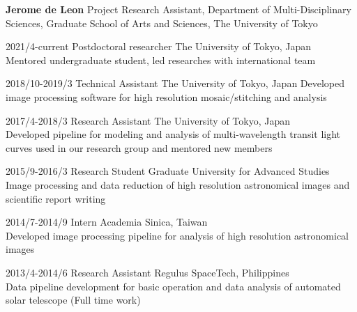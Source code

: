 \documentclass[12pt,letterpaper]{article}
\begin{document}
\thispagestyle{empty}\sloppy\sloppypar\raggedbottom

\textbf{\Large Jerome de Leon} 
Project Research Assistant, Department of Multi-Disciplinary Sciences, Graduate School of Arts and Sciences, The University of Tokyo\\[0.5ex]

\begin{list}{}{\cvlist}
\item 2021/4-current	Postdoctoral researcher	The University of Tokyo, Japan\\
Mentored undergraduate student, led researches with international team\\
\item 2018/10-2019/3	Technical Assistant		The University of Tokyo, Japan
Developed image processing software for high resolution mosaic/stitching and analysis\\
\item 2017/4-2018/3 	Research Assistant		The University of Tokyo, Japan\\
Developed pipeline for modeling and analysis of multi-wavelength transit light curves used in our research group and mentored new members\\ 
\item 2015/9-2016/3 	Research Student		Graduate University for Advanced Studies\\
Image processing and data reduction of high resolution astronomical images and scientific report writing\\
\item 2014/7-2014/9		Intern				Academia Sinica, Taiwan\\
Developed image processing pipeline for analysis of high resolution astronomical images\\
\item 2013/4-2014/6  	Research Assistant 	Regulus SpaceTech, Philippines\\
Data pipeline development for basic operation and data analysis of automated solar telescope (Full time work)\\

\end{list}

\begin{list}{}{\cvlist}

\end{list}

\end{document}
